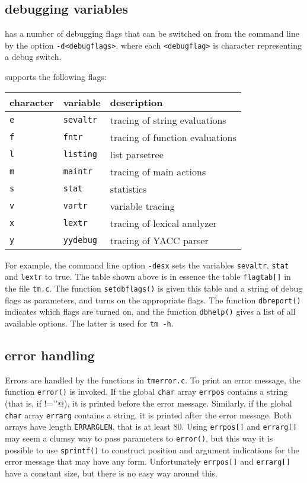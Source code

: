 \subsection{debugging variables}
{\Tm} has a number of debugging flags
that can be switched on from the command line by the
option \verb!-d<debugflags>!,
where each \verb!<debugflag>! is character representing a debug switch.
\par
{\Tm} supports the following flags:
\par
\begin{tabular}{lll}
character & variable & description \\
\hline
{\tt e} & {\tt sevaltr} & tracing of string evaluations \\
{\tt f} & {\tt fntr} & tracing of function evaluations \\
{\tt l} & {\tt listing} & list parsetree \\
{\tt m} & {\tt maintr} & tracing of main actions \\
{\tt s} & {\tt stat} & statistics \\
{\tt v} & {\tt vartr} & variable tracing \\
{\tt x} & {\tt lextr} & tracing of lexical analyzer \\
{\tt y} & {\tt yydebug} & tracing of YACC parser \\
\end{tabular}
\par
For example, the command line option \verb!-desx! sets the variables
{\tt sevaltr}, {\tt stat} and {\tt lextr} to true.
The table shown above is in essence the table {\tt flagtab[]}
in the file {\tt tm.c}.
The function {\tt setdbflags()} is given this table and a string of debug
flags as parameters, and turns on the appropriate flags.
The function {\tt dbreport()} indicates which flags are turned on,
and the function {\tt dbhelp()} gives a list of all available options.
The latter is used for \verb!tm -h!.
\subsection{error handling}
Errors are handled by the functions in {\tt tmerror.c}.
To print an error message, the function {\tt error()} is invoked.
If the global {\tt char} array {\tt errpos} contains a string (that
is, if \verb@errpos[0]!='\0'@),
it is printed before the error message. 
Similarly, if the global {\tt char} array {\tt errarg} contains a string,
it is printed after the error message.
Both arrays have length {\tt ERRARGLEN}, that is at least 80.
Using {\tt errpos[]} and {\tt errarg[]} may seem a clumsy way to pass
parameters to {\tt error()},
but this way it is possible to use {\tt sprintf()} to construct position
and argument indications for the error message that may have any form.
Unfortunately {\tt errpos[]} and {\tt errarg[]} have a constant size,
but there is no easy way around this.
